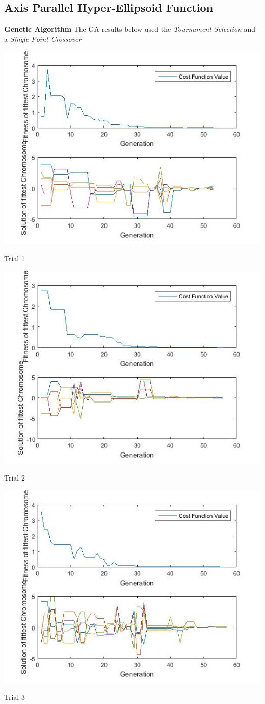 \documentclass{article}
\begin{document}
\subsection{Axis Parallel Hyper-Ellipsoid Function}
\textbf{Genetic Algorithm} The GA results below used the \textit{Tournament Selection} and a \textit{Single-Point Crossover}\\
\centerline{\includegraphics[width=0.5\linewidth]{ga_tf2_s1_c1a}}
\centerline{Trial 1}
\centerline{\includegraphics[width=0.5\linewidth]{ga_tf2_s1_c1b}}
\centerline{Trial 2}
\centerline{\includegraphics[width=0.5\linewidth]{ga_tf2_s1_c1c}}
\centerline{Trial 3}
\end{document}
